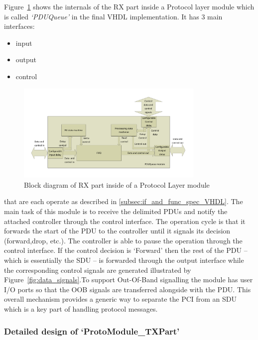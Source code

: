 \documentclass[conference]{IEEEtran}
\begin{document}
Figure~\ref{fig:proto_layer_rx_sch} shows the internals of the RX part inside a Protocol layer module which is called \emph{`PDUQueue'} in the final VHDL implementation. It has 3 main interfaces:
\begin{itemize}
\renewcommand \labelitemi{--}
\item input
\item output
\item control
\end{itemize}
\begin{figure}[!htb]
    \centering
    \includegraphics[width=9cm]{figures_raw/pdu_queue_imp.pdf}
    \caption{Block diagram of RX part inside of a Protocol Layer module}
    \label{fig:proto_layer_rx_sch}
\end{figure}
that are each operate as described in \ref{subsec:if_and_func_spec_VHDL}. The main task of this module is to receive the delimited PDUs and notify the attached controller through the control interface. The operation cycle is that it forwards the start of the PDU to the controller until it signals its decision (forward,drop, etc.). The controller is able to pause the operation through the control interface. If the control decision is `Forward' then the rest of the PDU -- which is essentially the SDU -- is forwarded through the output interface while the corresponding control signals are generated illustrated by Figure~\ref{fig:data_signals}.To support Out-Of-Band signalling the module has user I/O ports so that the OOB signals are transferred alongside with the PDU. This overall mechanism provides a generic way to separate the PCI from an SDU which is a key part of handling protocol messages.

\subsubsection{Detailed design of `ProtoModule\_TXPart'}
\end{document}
